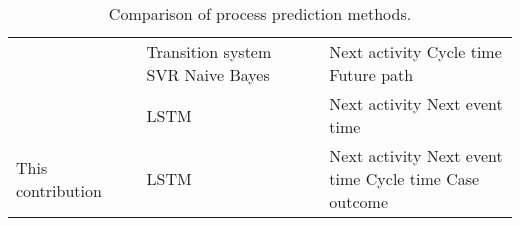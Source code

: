 \begin{table}[]
\begin{tabularx}{\textwidth}{
			>{\hsize=2.0\hsize}X
			>{\hsize=0.4\hsize}X
			>{\hsize=1.3\hsize}X
			>{\hsize=0.5\hsize}X
			>{\hsize=0.5\hsize}X
			>{\hsize=1.3\hsize}X
		}
		 \citeauthor{DBLP:journals/computing/PolatoSBL18} \cite{DBLP:journals/computing/PolatoSBL18}&  \citeyear{DBLP:journals/computing/PolatoSBL18} &  Transition system \newline SVR \newline Naive Bayes &  \checkmark & \xmark & Next activity \newline Cycle time \newline Future path \\
		 
		 \citeauthor{DBLP:conf/icpm/ParkS19} \cite{DBLP:conf/icpm/ParkS19} & \citeyear{DBLP:conf/icpm/ParkS19} & LSTM & \checkmark & \xmark &Next activity \newline Next event time  \\
		 
		 This contribution &  2020 &  LSTM & \checkmark & \checkmark &  Next activity \newline Next event time  \newline Cycle time \newline Case outcome
	 	\\ \bottomrule
	\end{tabularx}
	\caption[Comparison  of process prediction methods]{Comparison  of process prediction methods.}
	\label{tab:preliminaries}
\end{table}